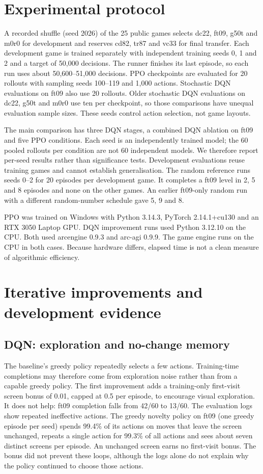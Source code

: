\documentclass[10pt]{article}
\begin{document}
\section{Experimental protocol}
A recorded shuffle (seed 2026) of the 25 public games selects dc22, ft09, g50t and m0r0 for development and reserves cd82, tr87 and vc33 for final transfer. Each development game is trained separately with independent training seeds 0, 1 and 2 and a target of 50,000 decisions. The runner finishes its last episode, so each run uses about 50,600--51,000 decisions. PPO checkpoints are evaluated for 20 rollouts with sampling seeds 100--119 and 1,000 actions. Stochastic DQN evaluations on ft09 also use 20 rollouts. Older stochastic DQN evaluations on dc22, g50t and m0r0 use ten per checkpoint, so those comparisons have unequal evaluation sample sizes. These seeds control action selection, not game layouts.

The main comparison has three DQN stages, a combined DQN ablation on ft09 and five PPO conditions. Each seed is an independently trained model; the 60 pooled rollouts per condition are not 60 independent models. We therefore report per-seed results rather than significance tests. Development evaluations reuse training games and cannot establish generalisation. The random reference runs seeds 0--2 for 20 episodes per development game. It completes a ft09 level in 2, 5 and 8 episodes and none on the other games. An earlier ft09-only random run with a different random-number schedule gave 5, 9 and 8.

PPO was trained on Windows with Python 3.14.3, PyTorch 2.14.1+cu130 and an RTX 3050 Laptop GPU. DQN improvement runs used Python 3.12.10 on the CPU. Both used arcengine 0.9.3 and arc-agi 0.9.9. The game engine runs on the CPU in both cases. Because hardware differs, elapsed time is not a clean measure of algorithmic efficiency.

\section{Iterative improvements and development evidence}
\subsection{DQN: exploration and no-change memory}
The baseline's greedy policy repeatedly selects a few actions. Training-time completions may therefore come from exploration noise rather than from a capable greedy policy. The first improvement adds a training-only first-visit screen bonus of 0.01, capped at 0.5 per episode, to encourage visual exploration. It does not help: ft09 completion falls from 42/60 to 13/60. The evaluation logs show repeated ineffective actions. The greedy novelty policy on ft09 (one greedy episode per seed) spends 99.4\% of its actions on moves that leave the screen unchanged, repeats a single action for 99.3\% of all actions and sees about seven distinct screens per episode. An unchanged screen earns no first-visit bonus. The bonus did not prevent these loops, although the logs alone do not explain why the policy continued to choose those actions.
\end{document}
